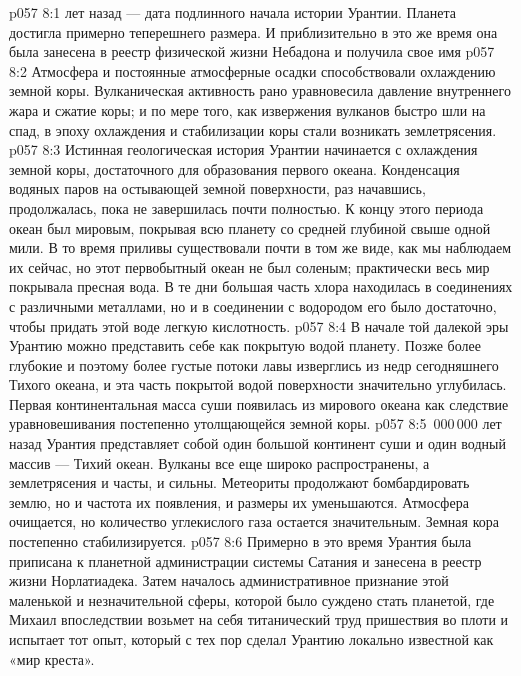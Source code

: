 \vs p057 8:1  лет назад --- дата подлинного начала истории Урантии. Планета достигла примерно теперешнего размера. И приблизительно в это же время она была занесена в реестр физической жизни Небадона и получила свое имя 
\vs p057 8:2 Атмосфера и постоянные атмосферные осадки способствовали охлаждению земной коры. Вулканическая активность рано уравновесила давление внутреннего жара и сжатие коры; и по мере того, как извержения вулканов быстро шли на спад, в эпоху охлаждения и стабилизации коры стали возникать землетрясения.
\vs p057 8:3 Истинная геологическая история Урантии начинается с охлаждения земной коры, достаточного для образования первого океана. Конденсация водяных паров на остывающей земной поверхности, раз начавшись, продолжалась, пока не завершилась почти полностью. К концу этого периода океан был мировым, покрывая всю планету со средней глубиной свыше одной мили. В то время приливы существовали почти в том же виде, как мы наблюдаем их сейчас, но этот первобытный океан не был соленым; практически весь мир покрывала пресная вода. В те дни большая часть хлора находилась в соединениях с различными металлами, но и в соединении с водородом его было достаточно, чтобы придать этой воде легкую кислотность.
\vs p057 8:4 В начале той далекой эры Урантию можно представить себе как покрытую водой планету. Позже более глубокие и поэтому более густые потоки лавы изверглись из недр сегодняшнего Тихого океана, и эта часть покрытой водой поверхности значительно углубилась. Первая континентальная масса суши появилась из мирового океана как следствие уравновешивания постепенно утолщающейся земной коры.
\vs p057 8:5 \,000\,000 лет назад Урантия представляет собой один большой континент суши и один водный массив --- Тихий океан. Вулканы все еще широко распространены, а землетрясения и часты, и сильны. Метеориты продолжают бомбардировать землю, но и частота их появления, и размеры их уменьшаются. Атмосфера очищается, но количество углекислого газа остается значительным. Земная кора постепенно стабилизируется.
\vs p057 8:6 Примерно в это время Урантия была приписана к планетной администрации системы Сатания и занесена в реестр жизни Норлатиадека. Затем началось административное признание этой маленькой и незначительной сферы, которой было суждено стать планетой, где Михаил впоследствии возьмет на себя титанический труд пришествия во плоти и испытает тот опыт, который с тех пор сделал Урантию локально известной как «мир креста».
